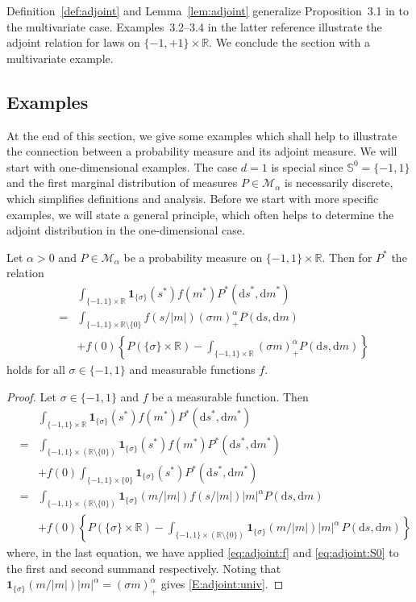 \documentclass{aptpubarxiv}
\numberwithin{equation}{section}
\begin{document}
Definition~\ref{def:adjoint} and Lemma~\ref{lem:adjoint} generalize Proposition~3.1 in \cite{S07} to the multivariate case. Examples~3.2--3.4 in the latter reference illustrate the adjoint relation for laws on $\{-1, +1\} \times \mathbb{R}$. We conclude the section with a multivariate example.

\iffalse
\subsection*{Examples} At the end of this section, we give some examples which shall help to illustrate the connection between a probability measure and its adjoint measure. We will start with one-dimensional examples. The case $d=1$ is special since $\mathbb{S}^0=\{-1,1\}$ and the first marginal distribution of measures $P \in \mathcal{M}_\alpha$ is necessarily discrete, which simplifies definitions and analysis. Before we start with more specific examples, we will state a general principle, which often helps to determine the adjoint distribution in the one-dimensional case.
\begin{cor}
Let $\alpha>0$ and $P\in \mathcal{M}_\alpha$ be a probability measure on $\{-1,1\} \times \mathbb{R}$. Then for $P^*$ the relation
\begin{eqnarray}\nonumber && \int_{\{-1,1\} \times \mathbb{R}}{\boldsymbol{1}}_{\{\sigma\}}(s^*)f(m^*)P^*({\mathrm{d}s}^*,{\mathrm{d}m}^*) \\
\nonumber &=&\int_{\{-1,1\} \times \mathbb{R} \setminus\{0\}}f(s/|m|)(\sigma m)_+^\alpha P({\mathrm{d}s},{\mathrm{d}m}) \\
\label{E:adjoint:univ} && + f(0)\left\{P(\{\sigma\} \times \mathbb{R})- \int_{\{-1,1\} \times \mathbb{R}}(\sigma m)_+^\alpha P({\mathrm{d}s}, {\mathrm{d}m})\right\}
\end{eqnarray}
holds for all $\sigma \in \{-1,1\}$ and measurable functions $f$. 
\end{cor}
\begin{proof}
Let $\sigma \in \{-1,1\}$ and $f$ be a measurable function. Then
\begin{eqnarray*}
 && \int_{\{-1,1\} \times \mathbb{R}}{\boldsymbol{1}}_{\{\sigma\}}(s^*)f(m^*)P^*({\mathrm{d}s}^*,{\mathrm{d}m}^*)\\
 &=& \int_{\{-1,1\} \times (\mathbb{R}\setminus \{0\})}{\boldsymbol{1}}_{\{\sigma\}}(s^*)f(m^*)P^*({\mathrm{d}s}^*,{\mathrm{d}m}^*)\\
 && +f(0)\int_{\{-1,1\} \times \{0\}}{\boldsymbol{1}}_{\{\sigma\}}(s^*)P^*({\mathrm{d}s}^*,{\mathrm{d}m}^*)\\
 &=& \int_{\{-1,1\} \times (\mathbb{R}\setminus \{0\})}{\boldsymbol{1}}_{\{\sigma\}}(m/|m|)f(s/|m|)|m|^\alpha P({\mathrm{d}s},{\mathrm{d}m})\\
 && +f(0)\left\{P(\{\sigma\} \times {\mathbb{R}}) - \int_{\{-1,1\} \times ({\mathbb{R}} \setminus \{ 0 \})} {\boldsymbol{1}}_{\{\sigma\}}(m/|m|)|m|^\alpha \, P({\mathrm{d}s}, {\mathrm{d}m})\right\}
\end{eqnarray*}
 where, in the last equation, we have applied \eqref{eq:adjoint:f} and \eqref{eq:adjoint:S0} to the first and second summand respectively. Noting that 
 ${\boldsymbol{1}}_{\{\sigma\}}(m/|m|)|m|^\alpha=(\sigma m)_+^\alpha$
 gives \eqref{E:adjoint:univ}.
\end{proof}
\end{document}
